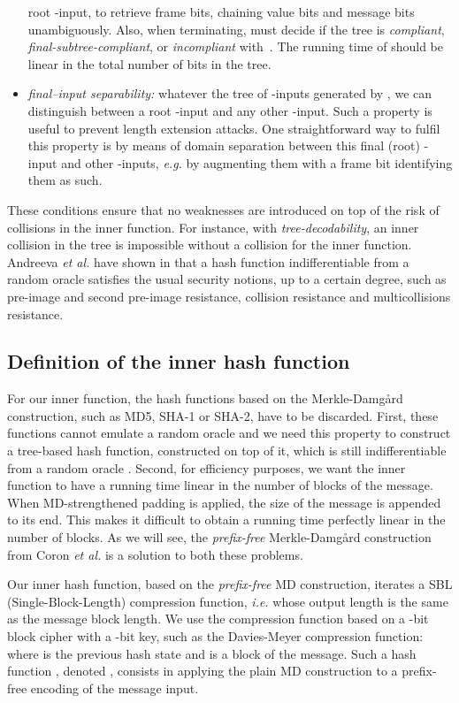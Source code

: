 \documentclass{llncs}
\begin{document}
\begin{itemize}
root -input, to retrieve frame bits, chaining value bits and message bits unambiguously. Also, when terminating, 
must decide if the tree is \emph{compliant}, \emph{final-subtree-compliant}, or \emph{incompliant} with~. 
The running time of  should be linear in the total number of bits in the tree.
\item \textit{final--input separability:}  
 whatever the tree  of -inputs generated by , we can distinguish between a root -input and any other -input.
Such a property is useful to prevent length extension attacks. 
 One straightforward way to fulfil this property is by means of domain separation between this final (root) -input and other -inputs, \emph{e.g.} 
 by augmenting them with a frame bit identifying them as such.
\end{itemize}



These conditions ensure that no weaknesses are introduced on top of
the risk of collisions in the inner function. For instance, with \emph{tree-decodability}, an inner
 collision in the tree is impossible without a collision for the inner function.
Andreeva \textit{et al.} have shown in 
\cite{AMP10,AMP10isc}
that a hash function indifferentiable from a random oracle
satisfies the usual security notions, up to a certain degree, such as pre-image and second pre-image resistance, 
collision resistance and multicollisions resistance.

\subsection{Definition of the inner hash function}

For our inner function, the hash functions based on the Merkle-Damg{\aa}rd construction, such as MD5, SHA-1 or SHA-2, have to be discarded. 
First, these functions cannot emulate a random oracle and we need this property to construct a tree-based hash function, 
constructed on top of it, which is still indifferentiable from a random oracle \cite{BDPV14_Suf}. Second, for efficiency purposes,
we want the inner function to have a running time linear in the number of blocks of the message. When MD-strengthened padding
is applied, the size of the message is appended to its end. This makes it difficult to obtain a running time perfectly linear in the number 
of blocks. As we will see, the \emph{prefix-free} Merkle-Damg{\aa}rd construction from Coron \emph{et al.} \cite{CDMP05} is a solution to both these problems.

Our inner hash function, based on the \emph{prefix-free} MD construction, iterates a SBL (Single-Block-Length) compression function, 
\emph{i.e.} whose output length is the same as the
message block length. We use the compression function
 based on a 
-bit block cipher with a -bit key, such as the Davies-Meyer compression function:  where  
is the previous hash state and  is a block of the message. Such a hash function \cite{CDMP05}, denoted , consists in applying the 
plain MD construction to a prefix-free encoding of the message input.~\\
\end{document}

